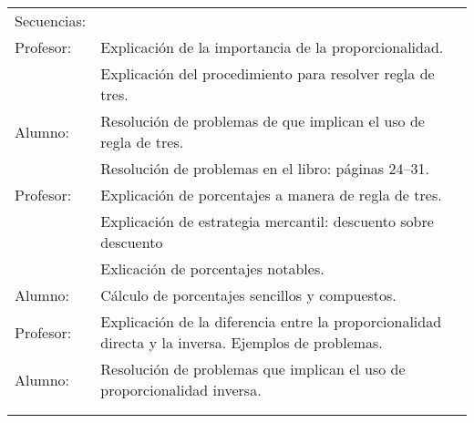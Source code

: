 \documentclass[letterpaper,10pt]{article}
\begin{document}
\begin{tabular}[t]{R{0.25\textwidth}p{0.71\textwidth}}
    \large{\sc Secuencias:} \\
    Profesor:   & Explicaci\'on de la importancia de la proporcionalidad. \\
                & Explicaci\'on del procedimiento para resolver regla de tres. \\
    Alumno:     & Resolución de problemas de que implican el uso de regla de tres. \\
                & Resoluci\'on de problemas en el libro: p\'aginas 24--31. \\
    Profesor:   & Explicaci\'on de porcentajes a manera de regla de tres. \\
                & Explicaci\'on de estrategia mercantil: descuento sobre descuento \\
                & Exlicaci\'on de porcentajes notables. \\
    Alumno:     & C\'alculo de porcentajes sencillos y compuestos. \\
    Profesor:   & Explicación de la diferencia entre la proporcionalidad directa y la inversa. Ejemplos de problemas. \\
    Alumno:     & Resoluci\'on de problemas que implican el uso de proporcionalidad inversa. \\
\\ \hline \\
\end{tabular}
\end{document}
